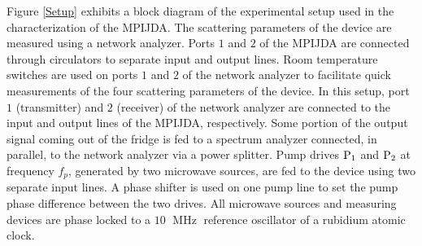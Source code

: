 \documentclass[aip,onecolumn,10pt]{revtex4}%
\begin{document}
Figure \ref{Setup} exhibits a block diagram of the experimental setup used in the characterization of the MPIJDA. The scattering parameters of the device are measured using a network analyzer. Ports $1$ and $2$ of the MPIJDA are connected through circulators to separate input and output lines. Room temperature switches are used on ports $1$ and $2$ of the network analyzer to facilitate quick measurements of the four scattering parameters of the device. In this setup, port $1$ (transmitter) and $2$ (receiver) of the network analyzer are connected to the input and output lines of the MPIJDA, respectively. Some portion of the output signal coming out of the fridge is fed to a spectrum analyzer connected, in parallel, to the network analyzer via a power splitter. Pump drives $\rm{P_1}$ and $\rm{P_2}$ at frequency $f_p$, generated by two microwave sources, are fed to the device using two separate input lines. A phase shifter is used on one pump line to set the pump phase difference between the two drives. All microwave sources and measuring devices are phase locked to a $10$ $\operatorname{MHz}$ reference oscillator of a rubidium atomic clock.
\end{document}
